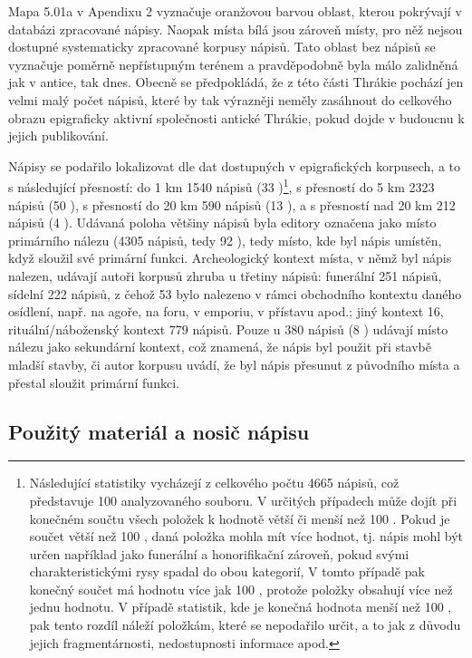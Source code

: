 Mapa 5.01a v Apendixu 2 vyznačuje oranžovou barvou oblast, kterou pokrývají v databázi zpracované nápisy. Naopak místa bílá jsou zároveň místy, pro něž nejsou dostupné systematicky zpracované korpusy nápisů. Tato oblast bez nápisů se vyznačuje poměrně nepřístupným terénem a pravděpodobně byla málo zalidněná jak v antice, tak dnes. Obecně se předpokládá, že z této části Thrákie pochází jen velmi malý počet nápisů, které by tak výrazněji neměly zasáhnout do celkového obrazu epigraficky aktivní společnosti antické Thrákie, pokud dojde v budoucnu k jejich publikování.

Nápisy se podařilo lokalizovat dle dat dostupných v epigrafických korpusech, a to s následující přesností: do 1 km 1540 nápisů (33 )\footnote{Následující statistiky vycházejí z celkového počtu 4665 nápisů, což představuje 100  analyzovaného souboru. V určitých případech může dojít při konečném součtu všech položek k hodnotě větší či menší než 100 . Pokud je součet větší než 100 , daná položka mohla mít více hodnot, tj. nápis mohl být určen například jako funerální a honorifikační zároveň, pokud svými charakteristickými rysy spadal do obou kategorií, V tomto případě pak konečný součet má hodnotu více jak 100 , protože položky obsahují více než jednu hodnotu. V případě statistik, kde je konečná hodnota menší než 100 , pak tento rozdíl náleží položkám, které se nepodařilo určit, a to jak z důvodu jejich fragmentárnosti, nedostupnosti informace apod.}, s přesností do 5 km 2323 nápisů (50 ), s přesností do 20 km 590 nápisů (13 ), a s přesností nad 20 km 212 nápisů (4 ). Udávaná poloha většiny nápisů byla editory označena jako místo primárního nálezu (4305 nápisů, tedy 92 ), tedy místo, kde byl nápis umístěn, když sloužil své primární funkci. Archeologický kontext místa, v němž byl nápis nalezen, udávají autoři korpusů zhruba u třetiny nápisů: funerální 251 nápisů, sídelní 222 nápisů, z čehož 53 bylo nalezeno v rámci obchodního kontextu daného osídlení, např. na agoře, na foru, v emporiu, v přístavu apod.; jiný kontext 16, rituální/náboženský kontext 779 nápisů. Pouze u 380 nápisů (8 ) udávají místo nálezu jako sekundární kontext, což znamená, že nápis byl použit při stavbě mladší stavby, či autor korpusu uvádí, že byl nápis přesunut z původního místa a přestal sloužit primární funkci.

\subsection[použitý-materiál-a-nosič-nápisu]{Použitý materiál a nosič nápisu}

